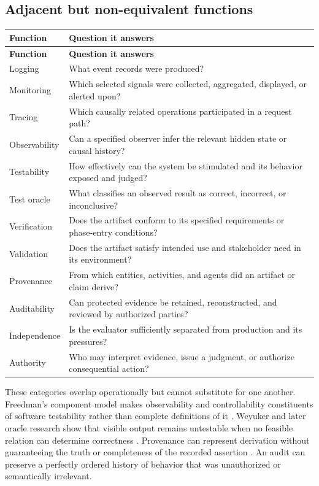 \documentclass[10pt,a4paper]{article}
\begin{document}
\subsection{Adjacent but non-equivalent functions}

\begin{longtable}{>{\raggedright\arraybackslash}p{}>{\raggedright\arraybackslash}p{}}
\hline
\textbf{Function} & \textbf{Question it answers} \\
\hline
\endfirsthead
\hline
\textbf{Function} & \textbf{Question it answers} \\
\hline
\endhead
Logging & What event records were produced? \\
Monitoring & Which selected signals were collected, aggregated, displayed, or alerted upon? \\
Tracing & Which causally related operations participated in a request path? \\
Observability & Can a specified observer infer the relevant hidden state or causal history? \\
Testability & How effectively can the system be stimulated and its behavior exposed and judged? \\
Test oracle & What classifies an observed result as correct, incorrect, or inconclusive? \\
Verification & Does the artifact conform to its specified requirements or phase-entry conditions? \\
Validation & Does the artifact satisfy intended use and stakeholder need in its environment? \\
Provenance & From which entities, activities, and agents did an artifact or claim derive? \\
Auditability & Can protected evidence be retained, reconstructed, and reviewed by authorized parties? \\
Independence & Is the evaluator sufficiently separated from production and its pressures? \\
Authority & Who may interpret evidence, issue a judgment, or authorize consequential action? \\
\hline
\end{longtable}

These categories overlap operationally but cannot substitute for one another. Freedman's component model makes observability and controllability constituents of software testability rather than complete definitions of it \cite{freedman1991}. Weyuker and later oracle research show that visible output remains untestable when no feasible relation can determine correctness \cite{weyuker1982,barr2015}. Provenance can represent derivation without guaranteeing the truth or completeness of the recorded assertion \cite{provdm2013}. An audit can preserve a perfectly ordered history of behavior that was unauthorized or semantically irrelevant.
\end{document}
